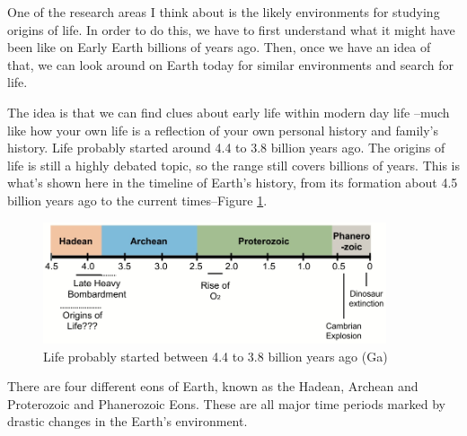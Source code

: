\documentclass[]{article}
\begin{document}
One of the research areas I think about is the likely environments for studying origins of life.
In order to do this, we have to first understand
what it might have been like on Early Earth billions of years ago.
Then, once we have an idea of that, we can look around on Earth today for similar environments and search for life.

The idea is that we can find clues about early life within modern day life --much like how your own life is a reflection of your own personal history and family's history.
Life probably started
around 4.4 to 3.8 billion years ago. The origins of life is still
a highly debated topic,
so the range still covers
billions of years.
This is what's shown here
in the timeline of Earth's history,
from its formation
about 4.5 billion years ago
to the current times--Figure \ref{fig:LifeProbablyStarted}.


\begin{figure}[H]
	\caption[Life probably started between 4.4 to 3.8 billion years ago]{Life probably started between 4.4 to 3.8 billion years ago (Ga) \cite{domagal2016astrobiology}} \label{fig:LifeProbablyStarted}
	\includegraphics[width=0.9\textwidth]{LifeProbablyStarted}
\end{figure}

There are four different eons of Earth,
known as the Hadean, Archean
and Proterozoic and Phanerozoic Eons.
These are all major time periods
marked by drastic changes
in the Earth's environment.
\end{document}

